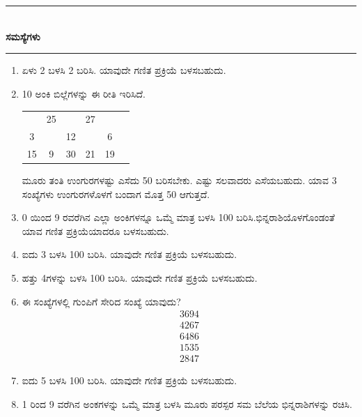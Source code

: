 \chapter[ಅಧ್ಯಾಯ 9]{}\label{chap9}

\begin{center}
\rule{5cm}{1pt}\\[5pt]
{\Large\bfseries ಸಮಸ್ಯೆಗಳು}\\[3pt]
\rule{5cm}{1pt}
\end{center}

\begin{enumerate}
\renewcommand{\labelenumi}{\bf\theenumi.}
\itemsep=5pt

\item ಏಳು 2 ಬಳಸಿ 2 ಬರಿಸಿ. ಯಾವುದೇ ಗಣಿತ ಪ್ರಕ್ರಿಯೆ ಬಳಸಬಹುದು. 

\item 10 ಅಂಕಿ ಬಿಲ್ಲೆಗಳನ್ನು ಈ ರೀತಿ ಇರಿಸಿದೆ. 

\begin{tabular}[t]{c@{\;}c@{\;}c@{\;}c@{\;}c@{\;}c}
& 25 & & 27 & & \\
3 & & 12 & & 6 & \\
15 & 9 & 30 & 21 & 19
\end{tabular}

ಮೂರು ತಂತಿ ಉಂಗುರಗಳಷ್ಟು ಎಸೆದು 50 ಬರಿಸಬೇಕು. ಎಷ್ಟು ಸಲವಾದರು ಎಸೆಯಬಹುದು. ಯಾವ 3 ಸಂಖ್ಯೆಗಳು ಉಂಗುರಗಳೊಳಗೆ ಬಂದಾಗ ಮೊತ್ತ 50 ಆಗುತ್ತದೆ. 

\item 0 ಯಿಂದ 9 ರವರೆಗಿನ ಎಲ್ಲಾ ಅಂಕಿಗಳನ್ನೂ ಒಮ್ಮೆ ಮಾತ್ರ ಬಳಸಿ 100 ಬರಿಸಿ.\break ಭಿನ್ನರಾಶಿಯೊಳಗೊಂಡಂತೆ ಯಾವ ಗಣಿತ ಪ್ರಕ್ರಿಯೆಯಾದರೂ ಬಳಸಬಹುದು. 

\item ಐದು 3 ಬಳಸಿ 100 ಬರಿಸಿ. ಯಾವುದೇ ಗಣಿತ ಪ್ರಕ್ರಿಯೆ ಬಳಸಬಹುದು. 

\item ಹತ್ತು 4ಗಳನ್ನು ಬಳಸಿ 100 ಬರಿಸಿ. ಯಾವುದೇ ಗಣಿತ ಪ್ರಕ್ರಿಯೆ ಬಳಸಬಹುದು. 

\item ಈ ಸಂಖ್ಯೆಗಳಲ್ಲಿ ಗುಂಪಿಗೆ ಸೇರಿದ ಸಂಖ್ಯೆ ಯಾವುದು? 
\begin{gather*}
3694\\
4267\\
6486\\
1535\\
2847
\end{gather*}

\item ಐದು 5 ಬಳಸಿ 100 ಬರಿಸಿ. ಯಾವುದೇ ಗಣಿತ ಪ್ರಕ್ರಿಯೆ ಬಳಸಬಹುದು. 

\item 1 ರಿಂದ 9 ವರೆಗಿನ ಅಂಕಗಳನ್ನು ಒಮ್ಮೆ ಮಾತ್ರ ಬಳಸಿ ಮೂರು ಪರಸ್ಪರ ಸಮ ಬೆಲೆಯ ಭಿನ್ನರಾಶಿಗಳನ್ನು ರಚಿಸಿ. 


\end{enumerate}
